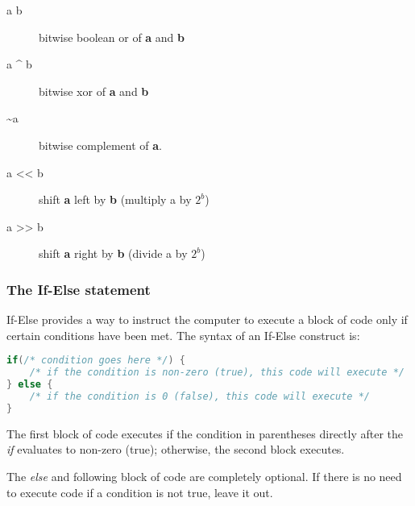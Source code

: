 \begin{description}
	\item[a \textbar{} b] bitwise boolean or of \textbf{a} and \textbf{b}
\end{description}

\begin{description}
	\item[a \^{} b] bitwise xor of \textbf{a} and \textbf{b}
\end{description}

\begin{description}
	\item[\~{}a] bitwise complement of \textbf{a}.
\end{description}

\begin{description}
	\item[a \textless{}\textless{} b] shift \textbf{a} left by \textbf{b} (multiply a by \(2^b\))
\end{description}

\begin{description}
	\item[a \textgreater{}\textgreater{} b] shift \textbf{a} right by \textbf{b} (divide a by \(2^b\))
\end{description}

\subsubsection{The If-Else statement}
If-Else provides a way to instruct the computer to execute a block of code only
if certain conditions have been met. The syntax of an If-Else construct is:
\lstset{basicstyle=\scriptsize, numbers=left, captionpos=b, tabsize=4}
\begin{lstlisting}[caption=Section \thesection listing \arabic{controlcnt},language={C},
breaklines=true,xleftmargin=15pt, label=lst:section\thesection listing\arabic{controlcnt}]
if(/* condition goes here */) {
	/* if the condition is non-zero (true), this code will execute */
} else {
	/* if the condition is 0 (false), this code will execute */
}
\end{lstlisting}

The first block of code executes if the condition in parentheses directly after
the \emph{if} evaluates to non-zero (true); otherwise, the second block
executes.

The \emph{else} and following block of code are completely optional. If there
is no need to execute code if a condition is not true, leave it out.


